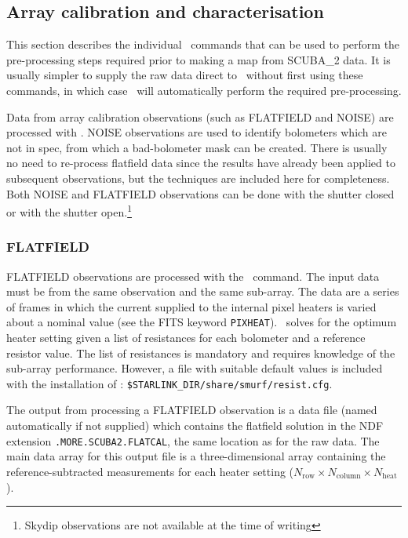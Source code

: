 \documentclass[oneside,11pt]{starlink}
\begin{document}
\subsection{Array calibration and characterisation\label{se:arraycal}}

This section describes the individual \SMURF\ commands that can be used
to perform the pre-processing steps required prior to making a map from
SCUBA\_2 data.  It is usually simpler to supply the raw data direct to
\makemap\ without first using these commands, in which case
\makemap\ will automatically perform the required pre-processing.

Data from array calibration observations (such as FLATFIELD and NOISE)
are processed with \SMURF. NOISE observations are used to identify
bolometers which are not in spec, from which a bad-bolometer mask can
be created. There is usually no need to re-process flatfield data
since the results have already been applied to subsequent observations, but
the techniques are included here for completeness. Both NOISE and
FLATFIELD observations can be done with the shutter closed or with the
shutter open.\footnote{Skydip observations are not available at the
  time of writing}

\subsubsection{FLATFIELD\label{se:flatcal}}

FLATFIELD observations are processed with the \calcflat\ command. The
input data must be from the same observation and the same
sub-array. The data are a series of frames in which the current
supplied to the internal pixel heaters is varied about a nominal value
(see the FITS keyword \texttt{PIXHEAT}). \calcflat\ solves for the
optimum heater setting given a list of resistances for each bolometer
and a reference resistor value. The list of resistances is mandatory
and requires knowledge of the sub-array performance. However, a file
with suitable default values is included with the installation of
\SMURF: \texttt{\$STARLINK\_DIR/share/smurf/resist.cfg}.

The output from processing a FLATFIELD observation is a data file
(named automatically if not supplied) which contains the flatfield
solution in the NDF extension \texttt{.MORE.SCUBA2.FLATCAL}, the same
location as for the raw data. The main data array for this output file
is a three-dimensional array containing the reference-subtracted
measurements for each heater setting ($N_{\textrm{row}}\times N_{\textrm{column}} \times N_{\textrm{heat}}$).
\end{document}
